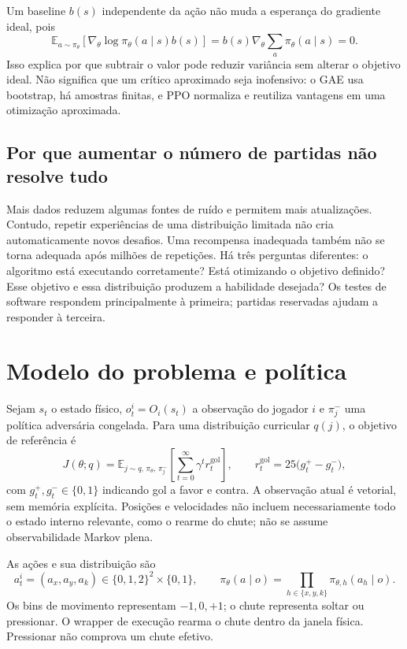 \documentclass[11pt,a4paper]{article}
\newcommand{\E}{\mathbb{E}}
\begin{document}
Um baseline $b(s)$ independente da ação não muda a esperança do gradiente ideal, pois
\begin{equation}
 \E_{a\sim\pi_\theta}[\nabla_\theta\log\pi_\theta(a\mid s)b(s)]
 =b(s)\nabla_\theta\sum_a\pi_\theta(a\mid s)=0.
\end{equation}
Isso explica por que subtrair o valor pode reduzir variância sem alterar o objetivo ideal. Não significa que um crítico aproximado seja inofensivo: o GAE usa bootstrap, há amostras finitas, e PPO normaliza e reutiliza vantagens em uma otimização aproximada.

\subsection{Por que aumentar o número de partidas não resolve tudo}
Mais dados reduzem algumas fontes de ruído e permitem mais atualizações. Contudo, repetir experiências de uma distribuição limitada não cria automaticamente novos desafios. Uma recompensa inadequada também não se torna adequada após milhões de repetições. Há três perguntas diferentes: o algoritmo está executando corretamente? Está otimizando o objetivo definido? Esse objetivo e essa distribuição produzem a habilidade desejada? Os testes de software respondem principalmente à primeira; partidas reservadas ajudam a responder à terceira.

\section{Modelo do problema e política}
Sejam $s_t$ o estado físico, $o_t^i=O_i(s_t)$ a observação do jogador $i$ e $\pi_j^-$ uma política adversária congelada. Para uma distribuição curricular $q(j)$, o objetivo de referência é
\begin{equation}
 J(\theta;q)=\E_{j\sim q,\,\pi_\theta,\,\pi_j^-}
 \left[\sum_{t=0}^{\infty}\gamma^t r_t^{\mathrm{gol}}\right],
 \qquad r_t^{\mathrm{gol}}=25\bigl(g_t^+-g_t^-\bigr),
 \label{eq:objective}
\end{equation}
com $g_t^+,g_t^-\in\{0,1\}$ indicando gol a favor e contra. A observação atual é vetorial, sem memória explícita. Posições e velocidades não incluem necessariamente todo o estado interno relevante, como o rearme do chute; não se assume observabilidade Markov plena.

As ações e sua distribuição são
\begin{equation}
 a_t^i=(a_x,a_y,a_k)\in\{0,1,2\}^2\times\{0,1\},\qquad
 \pi_\theta(a\mid o)=\prod_{h\in\{x,y,k\}}\pi_{\theta,h}(a_h\mid o).
\end{equation}
Os bins de movimento representam $-1,0,+1$; o chute representa soltar ou pressionar. O wrapper de execução rearma o chute dentro da janela física. Pressionar não comprova um chute efetivo.
\end{document}
